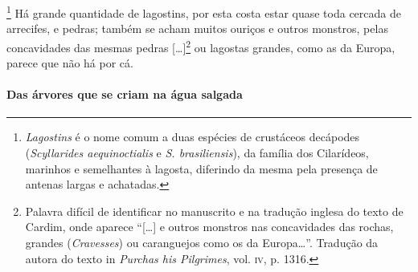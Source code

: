 \footnote{ \textit{Lagostins} é o nome comum a
duas espécies de crustáceos decápodes (\textit{Scyllarides
aequinoctialis} e \textit{S. brasiliensis}), da família dos Cilarídeos,
marinhos e semelhantes à lagosta, diferindo da mesma pela presença de
antenas largas e achatadas.} Há grande quantidade de
lagostins, por esta costa estar quase toda cercada de arrecifes, e
pedras; também se acham muitos ouriços e outros monstros, pelas
concavidades das mesmas pedras [\ldots{}]\footnote{ Palavra difícil de
identificar no manuscrito e na tradução inglesa do texto de Cardim,
onde aparece ``[\ldots{}] e outros monstros nas concavidades das rochas,
grandes (\textit{Cravesses}) ou caranguejos como os da Europa\ldots{}''.
Tradução da autora do texto in \textit{Purchas his Pilgrimes}, vol. \textsc{iv},
p. 1316.} ou lagostas grandes, como as da Europa, parece que não há por cá.


\paragraph{Das árvores que se criam na água salgada}

